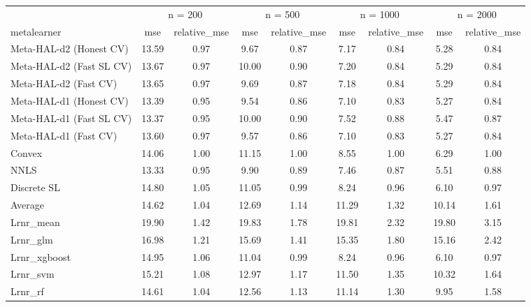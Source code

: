 
\begin{tabular}{lcccccccc}
\toprule
\multicolumn{1}{c}{ } & \multicolumn{2}{c}{n = 200} & \multicolumn{2}{c}{n = 500} & \multicolumn{2}{c}{n = 1000} & \multicolumn{2}{c}{n = 2000} \\
\cmidrule(l{3pt}r{3pt}){2-3} \cmidrule(l{3pt}r{3pt}){4-5} \cmidrule(l{3pt}r{3pt}){6-7} \cmidrule(l{3pt}r{3pt}){8-9}
metalearner & mse & relative\_mse & mse & relative\_mse & mse & relative\_mse & mse & relative\_mse\\
\midrule
Meta-HAL-d2 (Honest CV) & 13.59 & 0.97 & 9.67 & 0.87 & 7.17 & 0.84 & 5.28 & 0.84\\
Meta-HAL-d2 (Fast SL CV) & 13.67 & 0.97 & 10.00 & 0.90 & 7.20 & 0.84 & 5.29 & 0.84\\
Meta-HAL-d2 (Fast CV) & 13.65 & 0.97 & 9.69 & 0.87 & 7.18 & 0.84 & 5.29 & 0.84\\
Meta-HAL-d1 (Honest CV) & 13.39 & 0.95 & 9.54 & 0.86 & 7.10 & 0.83 & 5.27 & 0.84\\
Meta-HAL-d1 (Fast SL CV) & 13.37 & 0.95 & 10.00 & 0.90 & 7.52 & 0.88 & 5.47 & 0.87\\
Meta-HAL-d1 (Fast CV) & 13.60 & 0.97 & 9.57 & 0.86 & 7.10 & 0.83 & 5.27 & 0.84\\
Convex & 14.06 & 1.00 & 11.15 & 1.00 & 8.55 & 1.00 & 6.29 & 1.00\\
NNLS & 13.33 & 0.95 & 9.90 & 0.89 & 7.46 & 0.87 & 5.51 & 0.88\\
Discrete SL & 14.80 & 1.05 & 11.05 & 0.99 & 8.24 & 0.96 & 6.10 & 0.97\\
Average & 14.62 & 1.04 & 12.69 & 1.14 & 11.29 & 1.32 & 10.14 & 1.61\\
Lrnr\_mean & 19.90 & 1.42 & 19.83 & 1.78 & 19.81 & 2.32 & 19.80 & 3.15\\
Lrnr\_glm & 16.98 & 1.21 & 15.69 & 1.41 & 15.35 & 1.80 & 15.16 & 2.42\\
Lrnr\_xgboost & 14.95 & 1.06 & 11.04 & 0.99 & 8.24 & 0.96 & 6.10 & 0.97\\
Lrnr\_svm & 15.21 & 1.08 & 12.97 & 1.17 & 11.50 & 1.35 & 10.32 & 1.64\\
Lrnr\_rf & 14.61 & 1.04 & 12.56 & 1.13 & 11.14 & 1.30 & 9.95 & 1.58\\
\bottomrule
\end{tabular}
